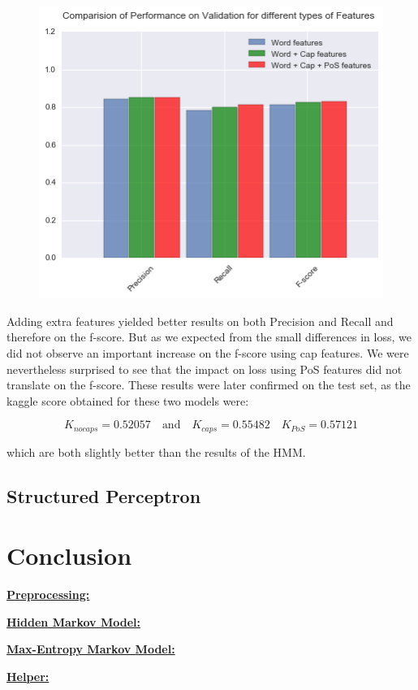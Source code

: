 \documentclass[11pt]{article}
\begin{document}
\begin{figure}[H]
\centering
\includegraphics[width=0.6\linewidth]{prf_cap}
\end{figure}

Adding extra features yielded better results on both Precision and Recall and therefore on the f-score. But as we expected from the small differences in loss, we did not observe an important increase on the f-score using cap features. We were nevertheless surprised to see that the impact on loss using PoS features did not translate on the f-score. These results were later confirmed on the test set, as the kaggle score obtained for these two models were:

$$K_{no caps} = 0.52057 \quad \text{and} \quad K_{caps} = 0.55482 \quad K_{PoS} = 0.57121$$

which are both slightly better than the results of the HMM.

\subsection{Structured Perceptron}


\section{Conclusion}




\begin{appendices}
\textbf{\huge\underline{Preprocessing:}}


\textbf{\huge\underline{Hidden Markov Model:}}


\textbf{\huge\underline{Max-Entropy Markov Model:}}


\textbf{\huge\underline{Helper:}}

\end{appendices}
\end{document}
